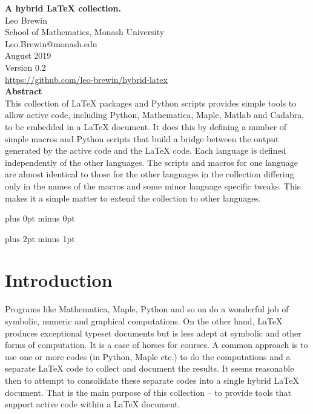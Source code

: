 \documentclass[12pt]{article}
\begin{document}


\begin{center}
   {\Large\bf A hybrid LaTeX collection.}\\[20pt]
   {Leo Brewin}\\[5pt]
   {School of Mathematics, Monash University}\\[5pt]
   {\tts Leo.Brewin@monash.edu}\\[5pt]
   {August 2019}\\[10pt]
   {Version 0.2}\\[10pt]
   {\href{https://github.com/leo-brewin/hybrid-latex}{https://github.com/leo-brewin/hybrid-latex}}\\[20pt]
   {\bf\small Abstract}\\[10pt]
   {\small{}%
      {This collection of LaTeX packages and Python scripts provides simple tools
      to allow active code, including Python, Mathematica, Maple, Matlab and
      Cadabra, to be embedded in a LaTeX document. It does this by defining a
      number of simple macros and Python scripts that build a bridge between the
      output generated by the active code and the LaTeX code. Each language is
      defined independently of the other languages. The scripts and macros for
      one language are almost identical to those for the other languages in the
      collection differing only in the names of the macros and some minor
      language specific tweaks. This makes it a simple matter to extend the
      collection to other languages.}}
\end{center}

\vskip 1cm

\parindent=0pt
\parskip=0pt plus 0pt minus 0pt

\tableofcontents

\vfill

\clearpage

\parindent=0pt
\parskip=8pt plus 2pt minus 1pt

\section{Introduction}

Programs like Mathematica, Maple, Python and so on do a wonderful job of symbolic,
numeric and graphical computations. On the other hand, LaTeX produces exceptional
typeset documents but is less adept at symbolic and other forms of computation. It
is a case of horses for courses. A common approach is to use one or more codes (in
Python, Maple etc.) to do the computations and a separate LaTeX code to collect and
document the results. It seems reasonable then to attempt to consolidate these
separate codes into a single hybrid LaTeX document. That is the main purpose of
this collection -- to provide tools that support active code within a LaTeX
document.
\end{document}

